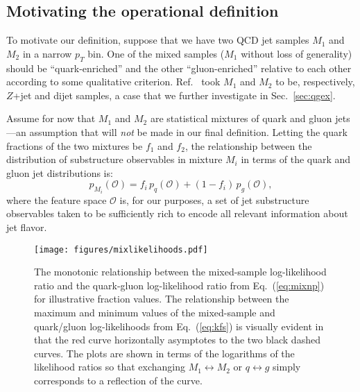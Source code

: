 \documentclass[letterpaper,11pt]{article}
\DeclareRobustCommand{\Sec}[1]{Sec.~\ref{#1}}
\DeclareRobustCommand{\Eq}[1]{Eq.~(\ref{#1})}
\DeclareRobustCommand{\Ref}[1]{Ref.~\cite{#1}}
\renewcommand{\O}{\mathcal{O}}
\begin{document}
\subsection{Motivating the operational definition}
\label{sec:motivation}


To motivate our definition, suppose that we have two QCD jet samples $M_1$ and $M_2$ in a narrow $p_T$ bin.
%
One of the mixed samples ($M_1$ without loss of generality) should be ``quark-enriched'' and the other ``gluon-enriched'' relative to each other according to some qualitative criterion.
%
\Ref{Gras:2017jty} took $M_1$ and $M_2$ to be, respectively, $Z$+jet and dijet samples, a case that we further investigate in \Sec{sec:qgex}.


Assume for now that $M_1$ and $M_2$ are statistical mixtures of quark and gluon jets---an assumption that will \emph{not} be made in our final definition.
%
Letting the quark fractions of the two mixtures be $f_1$ and $f_2$, the relationship between the distribution of substructure observables in  mixture $M_i$ in terms of the quark and gluon jet distributions is:
\begin{equation}
\label{eq:mixps}
p_{M_i}(\O)=f_i \, p_q(\O)+(1-f_i)\,p_g(\O),
\end{equation}
where the feature space $\O$ is, for our purposes, a set of jet substructure observables taken to be sufficiently rich to encode all relevant information about jet flavor.


\begin{figure}[t]
\centering
\texttt{[image: figures/mixlikelihoods.pdf]}
\caption{
%
The monotonic relationship between the mixed-sample log-likelihood ratio and the quark-gluon log-likelihood ratio from \Eq{eq:mixnp} for  illustrative fraction values.
%
The relationship between the maximum and minimum values of the mixed-sample and quark/gluon log-likelihoods from \Eq{eq:kfs} is visually evident in that the red curve horizontally asymptotes to the two black dashed curves.
%
The plots are shown in terms of the logarithms of the likelihood ratios so that exchanging $M_1\leftrightarrow M_2$ or $q\leftrightarrow g$ simply corresponds to a reflection of the curve.} 
\label{fig:mixloglikes}
\end{figure}
\end{document}
